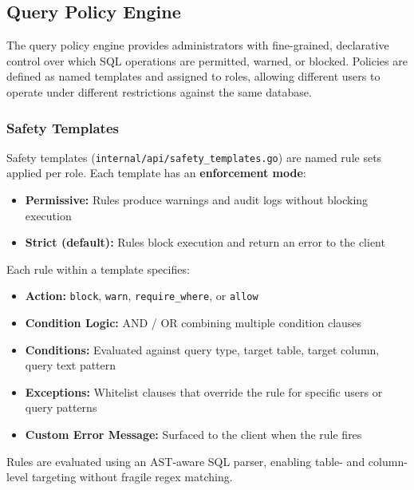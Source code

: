 \subsection{Query Policy Engine}
\label{subsec:query-policy-engine}

The query policy engine provides administrators with fine-grained, declarative control over which SQL operations are permitted, warned, or blocked. Policies are defined as named templates and assigned to roles, allowing different users to operate under different restrictions against the same database.

\subsubsection{Safety Templates}

Safety templates (\texttt{internal/api/safety\_templates.go}) are named rule sets applied per role. Each template has an \textbf{enforcement mode}:

\begin{itemize}[leftmargin=*]
    \item \textbf{Permissive:} Rules produce warnings and audit logs without blocking execution
    \item \textbf{Strict (default):} Rules block execution and return an error to the client
\end{itemize}

Each rule within a template specifies:
\begin{itemize}[leftmargin=*]
    \item \textbf{Action:} \texttt{block}, \texttt{warn}, \texttt{require\_where}, or \texttt{allow}
    \item \textbf{Condition Logic:} AND / OR combining multiple condition clauses
    \item \textbf{Conditions:} Evaluated against query type, target table, target column, query text pattern
    \item \textbf{Exceptions:} Whitelist clauses that override the rule for specific users or query patterns
    \item \textbf{Custom Error Message:} Surfaced to the client when the rule fires
\end{itemize}

Rules are evaluated using an AST-aware SQL parser, enabling table- and column-level targeting without fragile regex matching.

